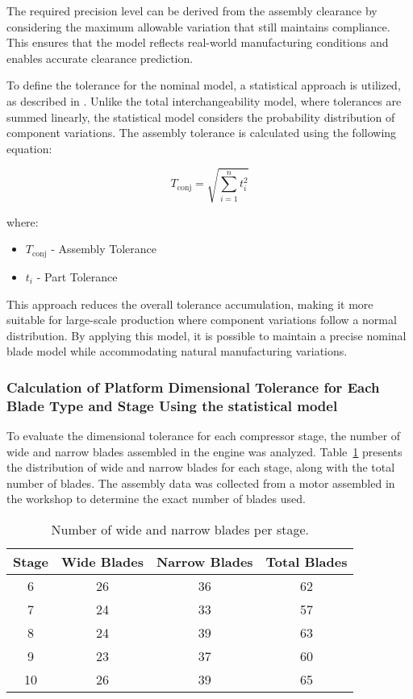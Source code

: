 The required precision level can be derived from the assembly clearance by considering the maximum allowable variation that still maintains compliance. This ensures that the model reflects real-world manufacturing conditions and enables accurate clearance prediction.

To define the tolerance for the nominal model, a statistical approach is utilized, as described in \cite{TSM}. Unlike the total interchangeability model, where tolerances are summed linearly, the statistical model considers the probability distribution of component variations. The assembly tolerance is calculated using the following equation:

\begin{equation}
    T_{\text{conj}} = \sqrt{\sum_{i=1}^{n} t_i^2}
    \label{eq:estat}
\end{equation}

where:
\begin{itemize}
\item $T_{\text{conj}}$ - Assembly Tolerance
\item $t_i$ - Part Tolerance
\end{itemize}

This approach reduces the overall tolerance accumulation, making it more suitable for large-scale production where component variations follow a normal distribution. By applying this model, it is possible to maintain a precise nominal blade model while accommodating natural manufacturing variations.

\subsubsection{Calculation of Platform Dimensional Tolerance for Each Blade Type and Stage Using the statistical model}
\label{subsubsec:clearance_calculation1}
To evaluate the dimensional tolerance for each compressor stage, the number of wide and narrow blades assembled in the engine was analyzed. Table~\ref{tab:blade_distribution} presents the distribution of wide and narrow blades for each stage, along with the total number of blades.
The assembly data was collected from a motor assembled in the workshop to determine the exact number of blades used.
\begin{table}[h]
    \centering
    \begin{tabular}{@{}cccc@{}}
        \toprule
        Stage & Wide Blades & Narrow Blades & Total Blades \\ 
        \midrule
        6  & 26 & 36 & 62 \\ 
        7  & 24 & 33 & 57 \\ 
        8  & 24 & 39 & 63 \\ 
        9  & 23 & 37 & 60 \\ 
        10 & 26 & 39 & 65 \\ 
        \bottomrule
    \end{tabular}
    \caption{Number of wide and narrow blades per stage.}
    \label{tab:blade_distribution}
\end{table}

